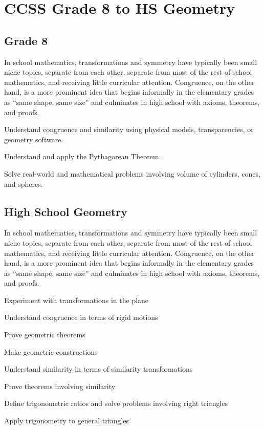 
 \chapter{CCSS Grade 8 to HS Geometry}  

\section{Grade 8}
In school mathematics, transformations and symmetry have typically been small niche topics, separate from each other, separate from most of the rest of school mathematics, and receiving little curricular attention.  Congruence, on the other hand, is a more prominent idea that begins informally in the elementary grades as ``same shape, same size'' and culminates in high school with axioms, theorems, and proofs.  

Understand congruence and similarity using physical models, transparencies, or geometry software.
   

Understand and apply the Pythagorean Theorem.

Solve real-world and mathematical problems involving volume of
cylinders, cones, and spheres.

\section{High School Geometry}
In school mathematics, transformations and symmetry have typically been small niche topics, separate from each other, separate from most of the rest of school mathematics, and receiving little curricular attention.  Congruence, on the other hand, is a more prominent idea that begins informally in the elementary grades as ``same shape, same size'' and culminates in high school with axioms, theorems, and proofs.  

Experiment with transformations in the plane

Understand congruence in terms of rigid motions

Prove geometric theorems

Make geometric constructions

Understand similarity in terms of similarity transformations

Prove theorems involving similarity

Define trigonometric ratios and solve problems involving right
triangles

Apply trigonometry to general triangles
